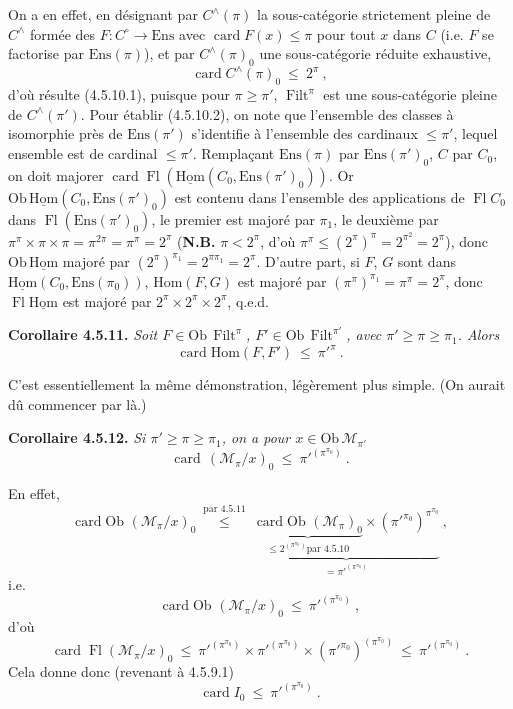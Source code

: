 \documentclass[11pt]{article}
\newcommand{\printedpage}[1]{\if\relax\detokenize{#1}\relax\else\marginpar{\footnotesize p.~#1}\fi}
\newcommand{\msp}[1]{\marginpar{\footnotesize [#1]}}
\newcommand{\uHom}{\underline{\mathrm{Hom}}}
\newcommand{\Ens}{\mathrm{Ens}}
\newcommand{\Hom}{\mathrm{Hom}}
\newcommand{\Ob}{\mathrm{Ob}\,}
\newcommand{\card}{\operatorname{card}}
\newcommand{\Fl}{\operatorname{Fl}}
\newcommand{\Filt}{\operatorname{Filt}}
\begin{document}
On a en effet, en désignant par $C^\wedge(\pi)$ la sous-catégorie strictement pleine de $C^\wedge$ formée des $F : C^\circ \longrightarrow \Ens$ avec $\card F(x) \leqslant \pi$ pour tout $x$ dans $C$ (i.e. $F$ se factorise par $\Ens(\pi)$), et par $C^\wedge(\pi)_0$ une
\printedpage{37}
\msp{page 123}
sous-catégorie réduite exhaustive,
\[
\card C^\wedge(\pi)_0 \ \leqslant \ 2^\pi \ , \tag*{(4.5.10.2)}
\]
d'où résulte (4.5.10.1), puisque pour $\pi \geqslant \pi'$, $\Filt^\pi$ est une sous-catégorie pleine de $C^\wedge(\pi')$. Pour établir (4.5.10.2), on note que l'ensemble des classes à isomorphie près de $\Ens(\pi')$ s'identifie à l'ensemble des cardinaux $\leqslant \pi'$, lequel ensemble est de cardinal $\leqslant \pi'$. Remplaçant $\Ens(\pi)$ par $\Ens(\pi')_0$, $C$ par $C_0$, on doit majorer $\card \Fl(\uHom(C_0, \Ens(\pi')_0))$. Or $\Ob \uHom(C_0, \Ens(\pi')_0)$ est contenu dans l'ensemble des applications de $\Fl C_0$ dans $\Fl(\Ens(\pi')_0)$, le premier est majoré par $\pi_1$, le deuxième par $\pi^\pi \times \pi \times \pi = \pi^{2\pi} = \pi^\pi = 2^\pi$ (\textbf{N.B.} $\pi < 2^\pi$, d'où $\pi^\pi \leqslant (2^\pi)^\pi = 2^{\pi^2} = 2^\pi$), donc $\Ob \uHom$ majoré par $(2^\pi)^{\pi_1} = 2^{\pi\pi_1} = 2^\pi$. D'autre part, si $F$, $G$ sont dans $\uHom(C_0, \Ens(\pi_0))$, $\Hom(F,G)$ est majoré par $(\pi^\pi)^{\pi_1} = \pi^\pi = 2^\pi$, donc $\Fl \uHom$ est majoré par $2^\pi \times 2^\pi \times 2^\pi$, q.e.d.

\textbf{Corollaire 4.5.11.} \textit{Soit $F \in \Ob \Filt^\pi$, $F' \in \Ob \Filt^{\pi'}$, avec $\pi' \geqslant \pi \geqslant \pi_1$. Alors}
\[
\card \Hom(F, F') \ \leqslant \ \pi'^{\pi} \ . \tag*{(4.5.11.1)}
\]

\msp{page 124}

C'est essentiellement la même démonstration, légèrement plus simple. (On aurait dû commencer par là.)

\textbf{Corollaire 4.5.12.} \textit{Si $\pi' \geqslant \pi \geqslant \pi_1$, on a pour $x \in \Ob \mathcal{M}_{\pi'}$}
\[
\card\,(\mathcal{M}_\pi/x)_0 \ \leqslant \ \pi'^{(\pi^{\pi_0})} \ . \tag*{(4.5.12)}
\]

En effet,
\[
\card \Ob\,(\mathcal{M}_\pi/x)_0 \ \overset{\text{par 4.5.11}}{\leqslant} \ \underbrace{\underbrace{\card \Ob\,(\mathcal{M}_\pi)_0}_{\leqslant 2^{(\pi^{\pi_0})} \text{par 4.5.10}} \times (\pi'^{\pi_0})^{\pi^{\pi_0}}}_{= \pi'^{(\pi^{\pi_0})}} \ ,
\]
i.e.
\[
\card \Ob\,(\mathcal{M}_\pi/x)_0 \ \leqslant \ \pi'^{(\pi^{\pi_0})} \ ,
\]
d'où
\[
\card \Fl(\mathcal{M}_\pi/x)_0 \ \leqslant \ \pi'^{(\pi^{\pi_0})} \times \pi'^{(\pi^{\pi_0})} \times (\pi'^{\pi_0})^{(\pi^{\pi_0})} \ \leqslant \ \pi'^{(\pi^{\pi_0})} \ .
\]
Cela donne donc (revenant à 4.5.9.1)
\[
\card I_0 \ \leqslant \ \pi'^{(\pi^{\pi_0})} \ .
\]
\end{document}
